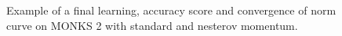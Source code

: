 \begin{appendices}
\begin{figure}[H]
\begin{subfigure}{0.40\textwidth}
                    \label{fig:monks_2_ACC_SGD}
                \end{subfigure}
                \begin{subfigure}{0.40\textwidth}
                    \caption{}
                    \label{fig:monks_2_NORM_SGD}
                \end{subfigure}
                \caption{Example of a final learning, accuracy score and convergence of norm curve on MONKS 2 with standard and nesterov momentum.}
                \label{fig:monks_2_SGD}
            \end{figure}


\end{appendices}
